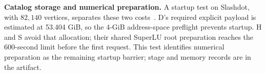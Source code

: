\textbf{Catalog storage and numerical preparation.} A startup test on Slashdot, with $82{,}140$ vertices, separates these two costs~\cite{snapslashdot,leskovec2010signed}. D's required explicit payload is estimated at 53.404 GiB, so the 4-GiB address-space preflight prevents startup. H and S avoid that allocation; their shared SuperLU root preparation reaches the 600-second limit before the first request. This test identifies numerical preparation as the remaining startup barrier; stage and memory records are in the artifact.

